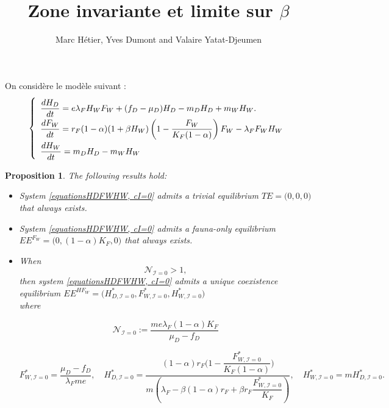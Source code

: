 \documentclass{article}
\title{Zone invariante et limite sur $\beta$ }
\author{Marc Hétier, Yves Dumont  and Valaire Yatat-Djeumen}
\newcommand{\lfw}{\lambda_{F}}
\newcommand{\lfw}{\lambda_{F}}
\newcommand{\cI}{\mathcal{I}}
\newtheorem{prop}{Proposition}
\begin{document}
\maketitle
On considère le modèle suivant :
\begin{equation}
\def\arraystretch{2}
\left\{ 
\begin{array}{l}
\dfrac{dH_D}{dt}= e\lfw H_W F_W + (f_D - \mu_D) H_D - m_D H_D + m_W H_W. \\
\dfrac{dF_W}{dt} = r_F(1- \alpha) (1+ \beta H_W) \left(1 - \dfrac{F_W}{K_F(1-\alpha)} \right) F_W - \lfw F_W H_W \\
\dfrac{dH_W}{dt}= m_D H_D - m_W H_W 
\end{array} \right.
\label{equationsHDFWHW, cI=0}
\end{equation}


\begin{prop}
\label{theoremEquilibre, cI=0}
The following results hold:
\begin{itemize}
\item System \eqref{equationsHDFWHW, cI=0} admits a trivial equilibrium $TE = \Big(0,0,0\Big)$ that always exists.
\item System \eqref{equationsHDFWHW, cI=0} admits a fauna-only equilibrium $EE^{F_W} = \Big(0, (1-\alpha)K_F, 0 \Big)$ that always exists.
\item When
$$
\mathcal{N}_{\cI = 0} >1,
$$ 
then system \eqref{equationsHDFWHW, cI=0} admits a unique coexistence equilibrium $EE^{HF_W} = \Big(H^*_{D, \cI = 0}, F^*_{W, \cI = 0}, H^*_{W, \cI = 0} \Big)$ \\ 
where 

\begin{equation*}
\mathcal{N}_{\cI = 0} := \dfrac{m e \lfw (1-\alpha)K_F}{\mu_D - f_D}
\end{equation*}

$$F^*_{W, \cI = 0} = \dfrac{\mu_D - f_D}{\lfw m e},
\quad 
H^*_{D, \cI = 0} = \dfrac{(1-\alpha)r_F\Big(1 - \dfrac{F^*_{W, \cI = 0}}{K_F(1-\alpha)} \Big)}{m\left(\lfw - \beta (1-\alpha) r_F + \beta r_F  \dfrac{F^*_{W, \cI = 0}}{K_F}\right)} ,
\quad 
H^*_{W, \cI = 0} = m H^*_{D, \cI = 0}.$$
\end{itemize}
\end{prop}
\end{document}
